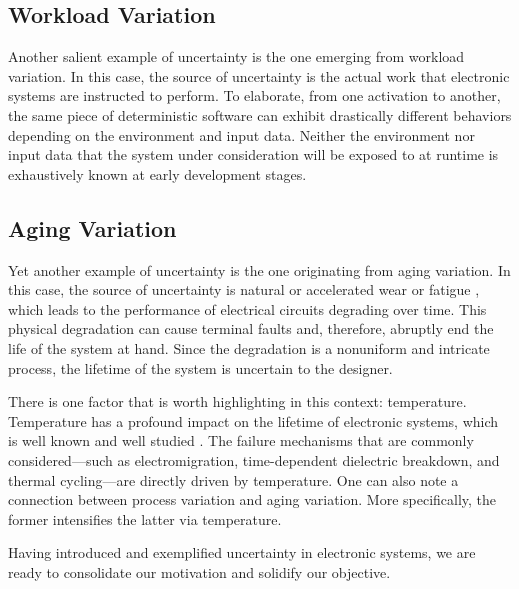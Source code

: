 \subsection{Workload Variation}

Another salient example of uncertainty is the one emerging from workload
variation. In this case, the source of uncertainty is the actual work that
electronic systems are instructed to perform. To elaborate, from one activation
to another, the same piece of deterministic software can exhibit drastically
different behaviors depending on the environment and input data. Neither the
environment nor input data that the system under consideration will be exposed
to at runtime is exhaustively known at early development stages.

\subsection{Aging Variation}

Yet another example of uncertainty is the one originating from aging variation.
In this case, the source of uncertainty is natural or accelerated wear or
fatigue \cite{jedec2016}, which leads to the performance of electrical circuits
degrading over time. This physical degradation can cause terminal faults and,
therefore, abruptly end the life of the system at hand. Since the degradation is
a nonuniform and intricate process, the lifetime of the system is uncertain to
the designer.

There is one factor that is worth highlighting in this context: temperature.
Temperature has a profound impact on the lifetime of electronic systems, which
is well known and well studied \cite{jedec2016}. The failure mechanisms that are
commonly considered---such as electromigration, time-dependent dielectric
breakdown, and thermal cycling---are directly driven by temperature. One can
also note a connection between process variation and aging variation. More
specifically, the former intensifies the latter via temperature.

\conclusioncut
Having introduced and exemplified uncertainty in electronic systems, we are
ready to consolidate our motivation and solidify our objective.
